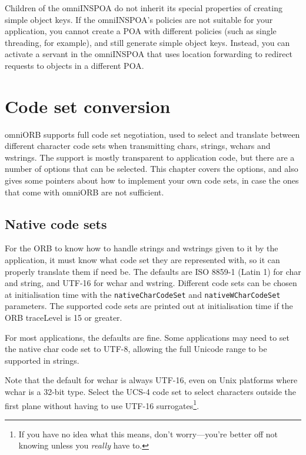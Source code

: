 \documentclass[11pt,twoside,a4paper]{book}
\newcommand{\code}[1]{\texttt{#1}}
\begin{document}
Children of the omniINSPOA do not inherit its special properties of
creating simple object keys. If the omniINSPOA's policies are not
suitable for your application, you cannot create a POA with different
policies (such as single threading, for example), and still generate
simple object keys. Instead, you can activate a servant in the
omniINSPOA that uses location forwarding to redirect requests to
objects in a different POA.





\chapter{Code set conversion}
\label{chap:codesets}

omniORB supports full code set negotiation, used to select and
translate between different character code sets when transmitting
chars, strings, wchars and wstrings. The support is mostly transparent
to application code, but there are a number of options that can be
selected. This chapter covers the options, and also gives some
pointers about how to implement your own code sets, in case the ones
that come with omniORB are not sufficient.


\section{Native code sets}

For the ORB to know how to handle strings and wstrings given to it by
the application, it must know what code set they are represented
with, so it can properly translate them if need be. The defaults are
ISO 8859-1 (Latin 1) for char and string, and UTF-16 for wchar and
wstring. Different code sets can be chosen at initialisation time with
the \code{nativeCharCodeSet} and \code{nativeWCharCodeSet}
parameters. The supported code sets are printed out at initialisation
time if the ORB traceLevel is 15 or greater.

For most applications, the defaults are fine. Some applications may
need to set the native char code set to UTF-8, allowing the full
Unicode range to be supported in strings.

Note that the default for wchar is always UTF-16, even on Unix
platforms where wchar is a 32-bit type. Select the UCS-4 code set to
select characters outside the first plane without having to use UTF-16
surrogates\footnote{If you have no idea what this means, don't
worry---you're better off not knowing unless you \emph{really} have
to.}.
\end{document}
